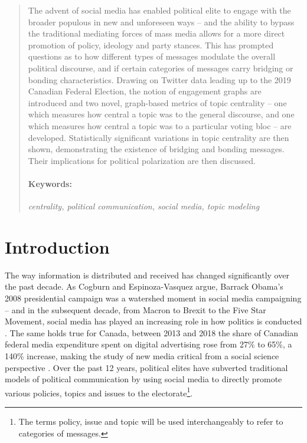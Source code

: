 \begin{abstract}
  The advent of social media has enabled political elite to engage with the
  broader populous in new and unforeseen ways -- and the ability to bypass the
  traditional mediating forces of mass media allows for a more direct promotion
  of policy, ideology and party stances. This has prompted questions as to how
  different types of messages modulate the overall political discourse, and if
  certain categories of messages carry bridging or bonding characteristics.
  Drawing on Twitter data leading up to the 2019 Canadian Federal Election, the
  notion of engagement graphs are introduced and two novel, graph-based metrics
  of topic centrality  -- one which measures how central a topic was to the
  general discourse, and one which measures how central a topic was to a
  particular voting bloc -- are developed. Statistically significant variations
  in topic centrality are then shown, demonstrating the existence of bridging
  and bonding messages. Their implications for political polarization are then
  discussed.
  \paragraph{Keywords:} \emph{centrality, political communication, social media, topic modeling}
\end{abstract}

\tableofcontents

\section{Introduction}

The way information is distributed and received has changed significantly over
the past decade. As Cogburn and Espinoza-Vasquez argue, Barrack Obama’s 2008
presidential campaign was a watershed moment in social media campaigning – and
in the subsequent decade, from Macron to Brexit to the Five Star Movement,
social media has played an increasing role in how politics is conducted
\cite{manucci2018wind,cogburn2011networked}.  The same holds true for Canada,
between 2013 and 2018 the share of Canadian federal media expenditure spent on
digital advertising rose from 27\% to 65\%, a 140\% increase, making the study
of new media critical from a social science perspective
\cite{annualReportCanadaAdvertisingActivities_2018}. Over the past 12 years,
political elites have subverted traditional models of political communication by
using social media to directly promote various policies, topics and issues to
the electorate\footnote{The terms policy, issue and topic will be used
interchangeably to refer to categories of
messages.}\cite{mcnair2017introduction}.


